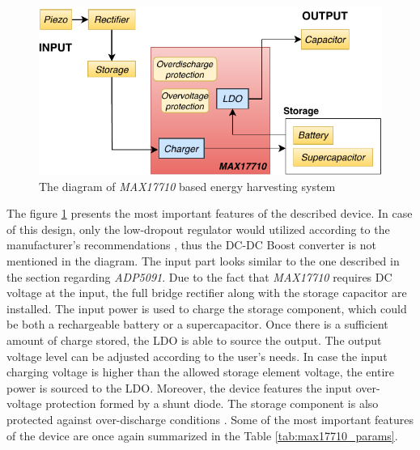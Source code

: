 \documentclass[12pt,a4paper]{article}
\begin{document}
\begin{figure}[ht!]
\includegraphics[scale=1.2]{MAX17710.pdf}
\caption{The diagram of \textit{MAX17710} based energy harvesting system}
\label{fig:max17710diagram}
\end{figure}

The figure \ref{fig:max17710diagram} presents the most important features of the described device. In case of this design, only the low-dropout regulator would utilized according to the manufacturer's recommendations \cite{max17710_params}, thus the DC-DC Boost converter is not mentioned in the diagram. The input part looks similar to the one described in the section regarding \textit{ADP5091}. Due to the fact that \textit{MAX17710} requires DC voltage at the input, the full bridge rectifier  along with the storage capacitor are installed. The input power is used to charge the storage component, which could be both a rechargeable battery or a supercapacitor. Once there is a sufficient amount of charge stored, the LDO is able to source the output. The output voltage level can be adjusted according to the user's needs. In case the input charging voltage is higher than the allowed storage element voltage, the entire power is sourced to the LDO. Moreover, the device features the input over-voltage protection formed by a shunt diode. The storage component is also protected against over-discharge conditions \cite{max17710_params}. Some of the most important features  of the device are once again summarized in the Table \ref{tab:max17710_params}.
\end{document}

